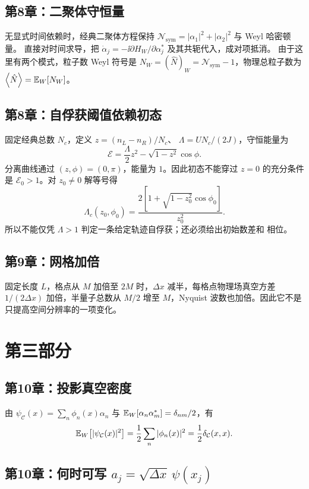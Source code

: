 \subsection*{第8章：二聚体守恒量}

无显式时间依赖时，经典二聚体方程保持
$\mathcal N_{\mathrm{sym}}=|\alpha_1|^2+|\alpha_2|^2$ 与 Weyl 哈密顿量。
直接对时间求导，把
$\dot\alpha_j=-\ii\partial H_W/\partial\alpha_j^*$ 及其共轭代入，成对项抵消。
由于这里有两个模式，粒子数 Weyl 符号是
$N_W=(\hat N)_W=\mathcal N_{\mathrm{sym}}-1$，物理总粒子数为
$\left\langle \hat N\right\rangle=\mathbb{E}_{W}\!\left[N_W\right]$。

\subsection*{第8章：自俘获阈值依赖初态}

固定经典总数 $N_c$，定义 $z=(n_L-n_R)/N_c$、
$\Lambda=UN_c/(2J)$，守恒能量为
\[
  \mathcal E=\frac{\Lambda}{2}z^2-\sqrt{1-z^2}\cos\phi.
\]
分离曲线通过 $(z,\phi)=(0,\pi)$，能量为 $1$。因此初态不能穿过
$z=0$ 的充分条件是 $\mathcal E_0>1$。对 $z_0\ne0$ 解等号得
\[
  \Lambda_c(z_0,\phi_0)=
  \frac{2[1+\sqrt{1-z_0^2}\cos\phi_0]}{z_0^2}.
\]
所以不能仅凭 $\Lambda>1$ 判定一条给定轨迹自俘获；还必须给出初始数差和
相位。

\subsection*{第9章：网格加倍}

固定长度 $L$，格点从 $M$ 加倍至 $2M$ 时，$\Delta x$ 减半，每格点物理场真空方差
$1/(2\Delta x)$ 加倍，半量子总数从 $M/2$ 增至 $M$，Nyquist 波数也加倍。因此它不是只提高空间分辨率的一项变化。

\section{第三部分}

\subsection*{第10章：投影真空密度}

由
$\psi_{\mathcal C}(x)=\sum_n\phi_n(x)\alpha_n$ 与
$\mathbb{E}_{W}\!\left[\alpha_n\alpha_m^*\right]=\delta_{nm}/2$，有
\[
  \mathbb{E}_{W}\!\left[|\psi_{\mathcal C}(x)|^2\right]
  =\frac12\sum_n|\phi_n(x)|^2
  =\frac12\delta_{\mathcal C}(x,x).
\]

\subsection*{第10章：何时可写 $a_j=\sqrt{\Delta x}\,\psi(x_j)$}

